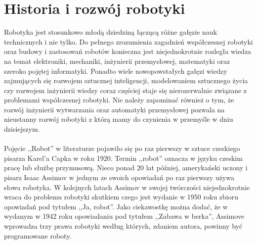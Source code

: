 \chapter{Historia i rozwój robotyki}
Robotyka jest stosunkowo młodą dziedziną łączącą różne gałęzie nauk technicznych
i nie tylko. Do pełnego zrozumienia zagadnień współczesnej robotyki oraz budowy
i zastosowań robotów konieczna jest niejednokrotnie rozległa wiedza na
temat elektroniki, mechaniki, inżynierii przemysłowej, matematyki oraz szeroko pojętej
informatyki. Ponadto wiele nowopowstałych gałęzi wiedzy zajmujących się rozwojem
sztucznej inteligencji, modelowaniem sztucznego życia czy rozwojem inżynierii
wiedzy coraz częściej staje się nierozerwalnie związane z problemami współczesnej
robotyki. Nie należy zapominać również o tym, że rozwój inżynierii wytwarzania
oraz automatyki przemysłowej pozwala na nieustanny rozwój robotyki z
którą mamy do czynienia w przemyśle w dniu dzisiejszym.\\
\\ 
Pojęcie ,,Robot'' w literaturze pojawiło się po raz pierwszy w sztuce czeskiego
pisarza Karel'a Capka w roku 1920. Termin ,,robot'' oznacza w języku czeskim
pracę lub służbę przymusową. Nieco ponad 20 lat później, amerykański uczony i
pisarz Isaac Assimov w jednym ze swoich opowiadań po raz pierwszy używa słowa
robotyka. W kolejnych latach Assimov w swojej twórczości niejednokrotnie wraca do
problemu robotyki skutkiem czego jest wydanie w 1950 roku zbioru opowiadań pod
tytułem ,,Ja, robot''. Jako ciekawostkę można dodać, że w wydanym w 1942 roku
opowiadaniu pod tytułem ,,Zabawa w berka'', Assimove wprowadza trzy prawa
robotyki według których, zdaniem autora, powinny być programowane
roboty\cite{Runaround}.


